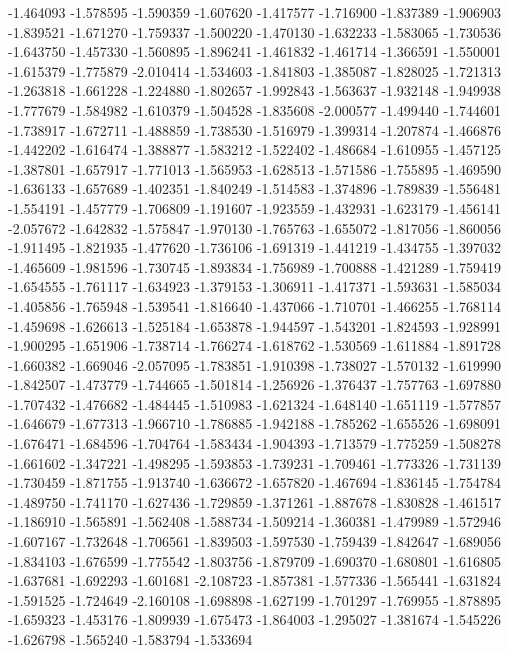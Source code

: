 -1.464093
-1.578595
-1.590359
-1.607620
-1.417577
-1.716900
-1.837389
-1.906903
-1.839521
-1.671270
-1.759337
-1.500220
-1.470130
-1.632233
-1.583065
-1.730536
-1.643750
-1.457330
-1.560895
-1.896241
-1.461832
-1.461714
-1.366591
-1.550001
-1.615379
-1.775879
-2.010414
-1.534603
-1.841803
-1.385087
-1.828025
-1.721313
-1.263818
-1.661228
-1.224880
-1.802657
-1.992843
-1.563637
-1.932148
-1.949938
-1.777679
-1.584982
-1.610379
-1.504528
-1.835608
-2.000577
-1.499440
-1.744601
-1.738917
-1.672711
-1.488859
-1.738530
-1.516979
-1.399314
-1.207874
-1.466876
-1.442202
-1.616474
-1.388877
-1.583212
-1.522402
-1.486684
-1.610955
-1.457125
-1.387801
-1.657917
-1.771013
-1.565953
-1.628513
-1.571586
-1.755895
-1.469590
-1.636133
-1.657689
-1.402351
-1.840249
-1.514583
-1.374896
-1.789839
-1.556481
-1.554191
-1.457779
-1.706809
-1.191607
-1.923559
-1.432931
-1.623179
-1.456141
-2.057672
-1.642832
-1.575847
-1.970130
-1.765763
-1.655072
-1.817056
-1.860056
-1.911495
-1.821935
-1.477620
-1.736106
-1.691319
-1.441219
-1.434755
-1.397032
-1.465609
-1.981596
-1.730745
-1.893834
-1.756989
-1.700888
-1.421289
-1.759419
-1.654555
-1.761117
-1.634923
-1.379153
-1.306911
-1.417371
-1.593631
-1.585034
-1.405856
-1.765948
-1.539541
-1.816640
-1.437066
-1.710701
-1.466255
-1.768114
-1.459698
-1.626613
-1.525184
-1.653878
-1.944597
-1.543201
-1.824593
-1.928991
-1.900295
-1.651906
-1.738714
-1.766274
-1.618762
-1.530569
-1.611884
-1.891728
-1.660382
-1.669046
-2.057095
-1.783851
-1.910398
-1.738027
-1.570132
-1.619990
-1.842507
-1.473779
-1.744665
-1.501814
-1.256926
-1.376437
-1.757763
-1.697880
-1.707432
-1.476682
-1.484445
-1.510983
-1.621324
-1.648140
-1.651119
-1.577857
-1.646679
-1.677313
-1.966710
-1.786885
-1.942188
-1.785262
-1.655526
-1.698091
-1.676471
-1.684596
-1.704764
-1.583434
-1.904393
-1.713579
-1.775259
-1.508278
-1.661602
-1.347221
-1.498295
-1.593853
-1.739231
-1.709461
-1.773326
-1.731139
-1.730459
-1.871755
-1.913740
-1.636672
-1.657820
-1.467694
-1.836145
-1.754784
-1.489750
-1.741170
-1.627436
-1.729859
-1.371261
-1.887678
-1.830828
-1.461517
-1.186910
-1.565891
-1.562408
-1.588734
-1.509214
-1.360381
-1.479989
-1.572946
-1.607167
-1.732648
-1.706561
-1.839503
-1.597530
-1.759439
-1.842647
-1.689056
-1.834103
-1.676599
-1.775542
-1.803756
-1.879709
-1.690370
-1.680801
-1.616805
-1.637681
-1.692293
-1.601681
-2.108723
-1.857381
-1.577336
-1.565441
-1.631824
-1.591525
-1.724649
-2.160108
-1.698898
-1.627199
-1.701297
-1.769955
-1.878895
-1.659323
-1.453176
-1.809939
-1.675473
-1.864003
-1.295027
-1.381674
-1.545226
-1.626798
-1.565240
-1.583794
-1.533694
